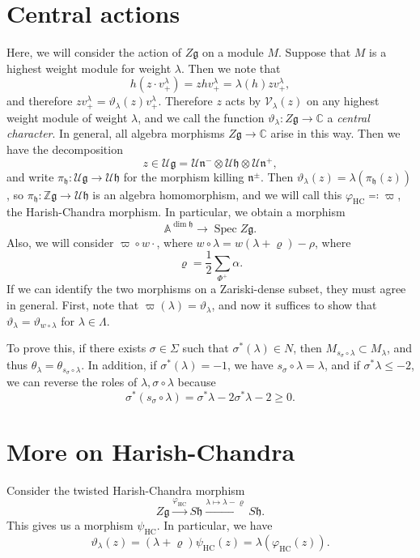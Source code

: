 \documentclass[leqno, openany]{memoir}
\theoremstyle{definition}
\theoremstyle{remark}
\theoremstyle{plain}
\theoremstyle{definition}
\theoremstyle{remark}
\newcommand{\A}{\mathbb{A}}
\newcommand{\C}{\mathbb{C}}
\newcommand{\Z}{\mathbb{Z}}
\newcommand{\U}{\mathcal{U}}
\newcommand{\g}{\mathfrak{g}}
\newcommand{\h}{\mathfrak{h}}
\newcommand{\n}{\mathfrak{n}}
\newcommand{\mc}[1]{\mathcal{#1}}
\newcommand{\mf}[1]{\mathfrak{#1}}
\newcommand{\mr}[1]{\mathrm{#1}}
\DeclareMathOperator{\Spec}{Spec}
\begin{document}
\section{Central actions}%
\label{sec:central_actions}

Here, we will consider the action of $Z \mf{g}$ on a module $M$. Suppose that $M$ is a highest weight module for weight $\lambda$. Then we note that
\[ h(z \cdot v_+^{\lambda}) = z h v_+^{\lambda} = \lambda(h) z v_+^{\lambda}, \]
and therefore $z v_+^{\lambda} = \vartheta_{\lambda}(z) v_+^{\lambda}$. Therefore $z$ acts by $\mc{V}_{\lambda}(z)$ on any highest weight module of weight $\lambda$, and we call the function $\vartheta_{\lambda} \colon Z \g \to \C$ a \textit{central character}. In general, all algebra morphisms $Z\g \to \C$ arise in this way. Then we have the decomposition
\[ z \in \U \g = \U \n^- \otimes \U \h \otimes \U \n^+, \]
and write $\pi_{\h} \colon \U \g \to \U \h$ for the morphism killing $\n^{\pm}$. Then $\vartheta_{\lambda}(z) = \lambda(\pi_{\h}(z))$, so $\pi_{\h} \colon \Z \g \to \U \h$ is an algebra homomorphism, and we will call this $\varphi_{\mr{HC}} \eqqcolon \varpi$, the Harish-Chandra morphism. In particular, we obtain a morphism
\[ \A^{\dim \h} \to \Spec Z \g. \]
Also, we will consider $\varpi \circ w \cdot$, where $w \circ \lambda = w(\lambda + \varrho) - \rho$, where 
\[ \varrho = \frac{1}{2} \sum_{\Phi^+} \alpha. \]
If we can identify the two morphisms on a Zariski-dense subset, they must agree in general. First, note that $\varpi(\lambda) = \vartheta_{\lambda}$, and now it suffices to show that $\vartheta_{\lambda} = \vartheta_{w \circ \lambda}$ for $\lambda \in \Lambda$.

To prove this, if there exists $\sigma \in \Sigma$ such that $\sigma^* (\lambda) \in N$, then $M_{s_{\sigma} \circ \lambda} \subset M_{\lambda}$, and thus $\theta_{\lambda} = \theta_{s_{\sigma} \circ \lambda}$. In addition, if $\sigma^*(\lambda) = -1$, we have $s_{\sigma} \circ \lambda = \lambda$, and if $\sigma^* \lambda \leq -2$, we can reverse the roles of $\lambda, \sigma \circ \lambda$ because
\[ \sigma^* (s_{\sigma} \circ \lambda) = \sigma^* \lambda - 2 \sigma^* \lambda -2 \geq 0. \]

\section{More on Harish-Chandra}%
\label{sec:more_on_harish_chandra}

Consider the twisted Harish-Chandra morphism
\[ Z \g \xrightarrow{\varphi_{\mr{HC}}} S \h \xrightarrow{\lambda \mapsto \lambda - \varrho} S \h. \]
This gives us a morphism $\psi_{\mr{HC}}$. In particular, we have
\[ \vartheta_{\lambda}(z) = (\lambda + \varrho) \psi_{\mr{HC}}(z) = \lambda(\varphi_{\mr{HC}}(z)). \]
\end{document}

